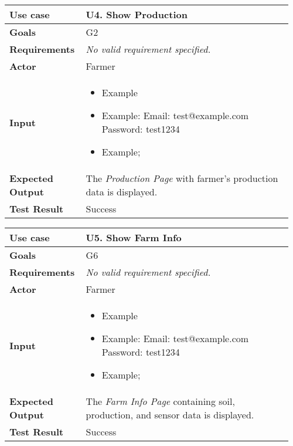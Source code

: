 \begin{longtable}{@{}p{0.25\linewidth}p{0.71\linewidth}@{}}
	\toprule
	\textbf{Use case} & \textbf{U4.} Show Production\\
	\midrule
	\textbf{Goals} & G2\\
	\midrule
	\textbf{Requirements} & \textit{No valid requirement specified.}\\
	\midrule
	\textbf{Actor} & Farmer\\
	\midrule
	\textbf{Input} & \begin{itemize}[leftmargin=.4cm,noitemsep,topsep=0pt,before=\vspace{-3mm},after=\vspace{-4mm}]
		\item Example
		\item Example:\newline
		Email: test@example.com\newline
		Password: test1234
		\item Example;
	\end{itemize}\\
	\midrule
	\textbf{Expected Output} & The \textit{Production Page} with farmer's production data is displayed.\\
	\midrule
	\textbf{Test Result} & Success\\
	\bottomrule
\end{longtable}

\begin{longtable}{@{}p{0.25\linewidth}p{0.71\linewidth}@{}}
	\toprule
	\textbf{Use case} & \textbf{U5.} Show Farm Info\\
	\midrule
	\textbf{Goals} & G6\\
	\midrule
	\textbf{Requirements} & \textit{No valid requirement specified.}\\
	\midrule
	\textbf{Actor} & Farmer\\
	\midrule
	\textbf{Input} & \begin{itemize}[leftmargin=.4cm,noitemsep,topsep=0pt,before=\vspace{-3mm},after=\vspace{-4mm}]
		\item Example
		\item Example:\newline
		Email: test@example.com\newline
		Password: test1234
		\item Example;
	\end{itemize}\\
	\midrule
	\textbf{Expected Output} & The \textit{Farm Info Page} containing soil, production, and sensor data is displayed.\\
	\midrule
	\textbf{Test Result} & Success\\
	\bottomrule
\end{longtable}

